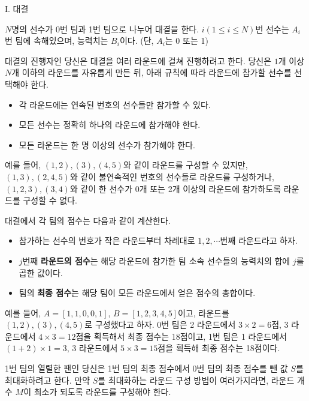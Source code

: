 \def\probtitle{대결}
\def\probno{I} %

\begin{problem}{\probno{}. \probtitle{}}

$N$명의 선수가 0번 팀과 1번 팀으로 나누어 대결을 한다. $i(1 \le i \le N)$번 선수는 $A_i$번 팀에 속해있으며, 능력치는 $B_i$이다. (단, $A_i$는 0 또는 1)

대결의 진행자인 당신은 대결을 여러 라운드에 걸쳐 진행하려고 한다. 당신은 $1$개 이상 $N$개 이하의 라운드를 자유롭게 만든 뒤, 아래 규칙에 따라 라운드에 참가할 선수를 선택해야 한다.

\begin{itemize}[topsep=0pt,noitemsep]
    \item 각 라운드에는 연속된 번호의 선수들만 참가할 수 있다.
    \item 모든 선수는 정확히 하나의 라운드에 참가해야 한다.
    \item 모든 라운드는 한 명 이상의 선수가 참가해야 한다.
\end{itemize}

예를 들어, $(1, 2), (3), (4, 5)$와 같이 라운드를 구성할 수 있지만, $(1, 3), (2, 4, 5)$와 같이 불연속적인 번호의 선수들로 라운드를 구성하거나, $(1, 2, 3), (3, 4)$와 같이 한 선수가 0개 또는 2개 이상의 라운드에 참가하도록 라운드를 구성할 수 없다.

대결에서 각 팀의 점수는 다음과 같이 계산한다.

\begin{itemize}[topsep=0pt,noitemsep]
    \item 참가하는 선수의 번호가 작은 라운드부터 차례대로 $1, 2, \cdots$번째 라운드라고 하자.
    \item $j$번째 \textbf{라운드의 점수}는 해당 라운드에 참가한 팀 소속 선수들의 능력치의 합에 $j$를 곱한 값이다.
    \item 팀의 \textbf{최종 점수}는 해당 팀이 모든 라운드에서 얻은 점수의 총합이다.
\end{itemize}

예를 들어, $A = [1, 1, 0, 0, 1]$, $B = [1, 2, 3, 4, 5]$이고, 라운드를 $(1, 2), (3), (4, 5)$로 구성했다고 하자. 0번 팀은 2 라운드에서 $3 \times 2 = 6$점, 3 라운드에서 $4 \times 3 = 12$점을 획득해서 최종 점수는 18점이고, 1번 팀은 1 라운드에서 $(1+2) \times 1 = 3$, 3 라운드에서 $5 \times 3 = 15$점을 획득해 최종 점수는 18점이다.

1번 팀의 열렬한 팬인 당신은 1번 팀의 최종 점수에서 0번 팀의 최종 점수를 뺀 값 $S$를 최대화하려고 한다. 만약 $S$를 최대화하는 라운드 구성 방법이 여러가지라면, 라운드 개수 $M$이 최소가 되도록 라운드를 구성해야 한다.


\end{problem}
